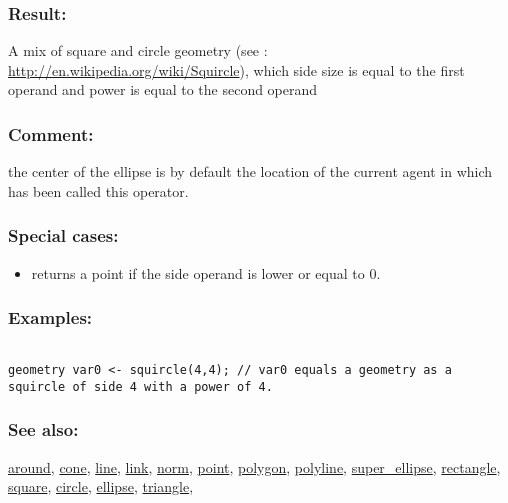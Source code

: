 \documentclass[]{book}
\providecommand{\tightlist}{%
  \setlength{\itemsep}{0pt}\setlength{\parskip}{0pt}}
\theoremstyle{definition}
\theoremstyle{definition}
\theoremstyle{definition}
\theoremstyle{remark}
\begin{document}
\subsubsection{Result:}\label{result-484}

A mix of square and circle geometry (see :
\url{http://en.wikipedia.org/wiki/Squircle}), which side size is equal
to the first operand and power is equal to the second operand

\subsubsection{Comment:}\label{comment-93}

the center of the ellipse is by default the location of the current
agent in which has been called this operator.

\subsubsection{Special cases:}\label{special-cases-131}

\begin{itemize}
\tightlist
\item
  returns a point if the side operand is lower or equal to 0.
\end{itemize}

\subsubsection{Examples:}\label{examples-349}

\begin{verbatim}
 
geometry var0 <- squircle(4,4); // var0 equals a geometry as a squircle of side 4 with a power of 4.
\end{verbatim}

\subsubsection{See also:}\label{see-also-196}

\href{OperatorsAA\#around}{around}, \href{OperatorsBC\#cone}{cone},
\href{OperatorsIM\#line}{line}, \href{OperatorsIM\#link}{link},
\href{OperatorsNR\#norm}{norm}, \href{OperatorsNR\#point}{point},
\href{OperatorsNR\#polygon}{polygon},
\href{OperatorsNR\#polyline}{polyline},
\href{OperatorsSZ\#super_ellipse}{super\_ellipse},
\href{OperatorsNR\#rectangle}{rectangle},
\href{OperatorsSZ\#square}{square}, \href{OperatorsBC\#circle}{circle},
\href{OperatorsDH\#ellipse}{ellipse},
\href{OperatorsSZ\#triangle}{triangle},
\end{document}
